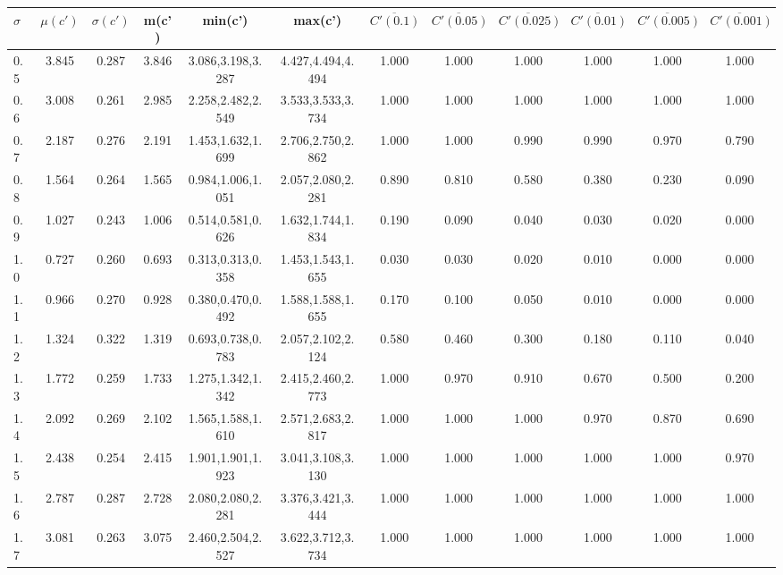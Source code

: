 \begin{table*}[h!]
\begin{center}
\begin{tabular}{| l | c | c | c | c | c | c | c | c | c | c | c |}\hline
$\sigma$ & $\mu(c')$ & $\sigma(c')$ & m(c') & min(c') & max(c') & $\overline{C'(0.1)}$ & $\overline{C'(0.05)}$ & $\overline{C'(0.025)}$ & $\overline{C'(0.01)}$ & $\overline{C'(0.005)}$ & $\overline{C'(0.001)}$ \\\hline
0.5 & 3.845 & 0.287 & 3.846 & 3.086,3.198,3.287 & 4.427,4.494,4.494  & 1.000  & 1.000  & 1.000  & 1.000  & 1.000  & 1.000 \\\hline
0.6 & 3.008 & 0.261 & 2.985 & 2.258,2.482,2.549 & 3.533,3.533,3.734  & 1.000  & 1.000  & 1.000  & 1.000  & 1.000  & 1.000 \\\hline
0.7 & 2.187 & 0.276 & 2.191 & 1.453,1.632,1.699 & 2.706,2.750,2.862  & 1.000  & 1.000  & 0.990  & 0.990  & 0.970  & 0.790 \\\hline
0.8 & 1.564 & 0.264 & 1.565 & 0.984,1.006,1.051 & 2.057,2.080,2.281  & 0.890  & 0.810  & 0.580  & 0.380  & 0.230  & 0.090 \\\hline
0.9 & 1.027 & 0.243 & 1.006 & 0.514,0.581,0.626 & 1.632,1.744,1.834  & 0.190  & 0.090  & 0.040  & 0.030  & 0.020  & 0.000 \\\hline
1.0 & 0.727 & 0.260 & 0.693 & 0.313,0.313,0.358 & 1.453,1.543,1.655  & 0.030  & 0.030  & 0.020  & 0.010  & 0.000  & 0.000 \\\hline
1.1 & 0.966 & 0.270 & 0.928 & 0.380,0.470,0.492 & 1.588,1.588,1.655  & 0.170  & 0.100  & 0.050  & 0.010  & 0.000  & 0.000 \\\hline
1.2 & 1.324 & 0.322 & 1.319 & 0.693,0.738,0.783 & 2.057,2.102,2.124  & 0.580  & 0.460  & 0.300  & 0.180  & 0.110  & 0.040 \\\hline
1.3 & 1.772 & 0.259 & 1.733 & 1.275,1.342,1.342 & 2.415,2.460,2.773  & 1.000  & 0.970  & 0.910  & 0.670  & 0.500  & 0.200 \\\hline
1.4 & 2.092 & 0.269 & 2.102 & 1.565,1.588,1.610 & 2.571,2.683,2.817  & 1.000  & 1.000  & 1.000  & 0.970  & 0.870  & 0.690 \\\hline
1.5 & 2.438 & 0.254 & 2.415 & 1.901,1.901,1.923 & 3.041,3.108,3.130  & 1.000  & 1.000  & 1.000  & 1.000  & 1.000  & 0.970 \\\hline
1.6 & 2.787 & 0.287 & 2.728 & 2.080,2.080,2.281 & 3.376,3.421,3.444  & 1.000  & 1.000  & 1.000  & 1.000  & 1.000  & 1.000 \\\hline
1.7 & 3.081 & 0.263 & 3.075 & 2.460,2.504,2.527 & 3.622,3.712,3.734  & 1.000  & 1.000  & 1.000  & 1.000  & 1.000  & 1.000 \\\hline

\end{tabular}
\end{center}
\end{table*}
